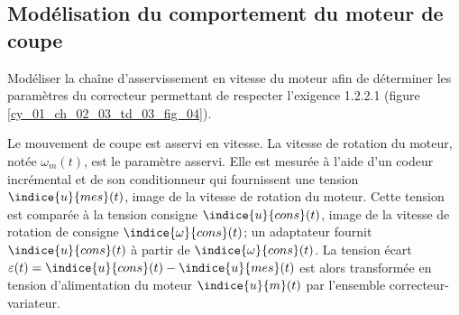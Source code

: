 \subsection*{Modélisation du comportement du moteur de coupe}

\begin{obj} 
Modéliser la chaîne d’asservissement en vitesse du moteur afin de déterminer les paramètres du correcteur permettant de respecter l’exigence 1.2.2.1 (figure \ref{cy_01_ch_02_03_td_03_fig_04}).
\end{obj}

\ifprof
\else
Le mouvement de coupe est asservi en vitesse. La vitesse de rotation du moteur, notée $\omega_m(t)$, est
le paramètre asservi. Elle est mesurée à l’aide d’un codeur incrémental et de son conditionneur qui
fournissent une tension $\indice{u}{mes}(t)$, image de la vitesse de rotation du moteur. Cette tension est comparée à
la tension consigne $\indice{u}{cons}(t)$, image de la vitesse de rotation de consigne $\indice{\omega}{cons}(t)$; un adaptateur fournit $\indice{u}{cons}(t)$ à partir de $\indice{\omega}{cons}(t)$. La tension écart $\varepsilon(t) = \indice{u}{cons}(t) - \indice{u}{mes}(t)$ est alors transformée en tension
d’alimentation du moteur $\indice{u}{m}(t)$ par l’ensemble correcteur-variateur.
\fi


